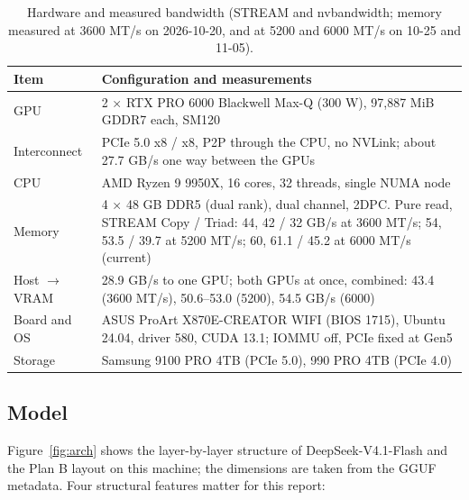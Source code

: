 \documentclass[11pt,a4paper]{article}
\begin{document}
\begin{table}[h]
  \centering
  \small
  \caption{Hardware and measured bandwidth (STREAM and nvbandwidth; memory measured at 3600 MT/s on 2026-10-20, and at 5200 and 6000 MT/s on 10-25 and 11-05).}
  \label{tab:hw}
  \begin{tabularx}{\textwidth}{@{}l X@{}}
    \toprule
    Item & Configuration and measurements \\
    \midrule
    GPU & 2 × RTX PRO 6000 Blackwell Max-Q (300 W), 97,887 MiB GDDR7 each, SM120 \\
    Interconnect & PCIe 5.0 x8 / x8, P2P through the CPU, no NVLink; about 27.7 GB/s one way between the GPUs \\
    CPU & AMD Ryzen 9 9950X, 16 cores, 32 threads, single NUMA node \\
    Memory & 4 × 48 GB DDR5 (dual rank), dual channel, 2DPC. Pure read, STREAM Copy / Triad: 44, 42 / 32 GB/s at 3600 MT/s; 54, 53.5 / 39.7 at 5200 MT/s; 60, 61.1 / 45.2 at 6000 MT/s (current) \\
    Host $\to$ VRAM & 28.9 GB/s to one GPU; both GPUs at once, combined: 43.4 (3600 MT/s), 50.6--53.0 (5200), 54.5 GB/s (6000) \\
    Board and OS & ASUS ProArt X870E-CREATOR WIFI (BIOS 1715), Ubuntu 24.04, driver 580, CUDA 13.1; IOMMU off, PCIe fixed at Gen5 \\
    Storage & Samsung 9100 PRO 4TB (PCIe 5.0), 990 PRO 4TB (PCIe 4.0) \\
    \bottomrule
  \end{tabularx}
\end{table}

\subsection{Model}

Figure~\ref{fig:arch} shows the layer-by-layer structure of DeepSeek-V4.1-Flash and the Plan B layout on this machine; the dimensions are taken from the GGUF metadata. Four structural features matter for this report:
\end{document}

